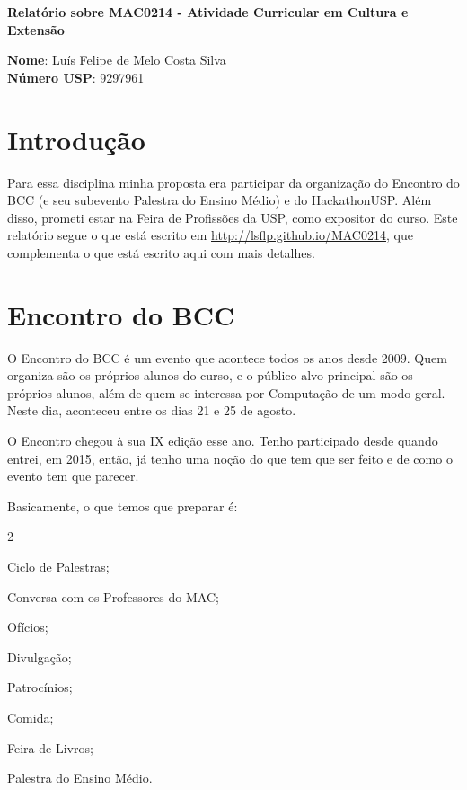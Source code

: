\documentclass[12pt,letterpaper]{article}
\begin{document}
	\begin{center}
		\Large \bf
		Relatório sobre MAC0214 - Atividade Curricular em Cultura e Extensão
	\end{center}
	
	\textbf{Nome}: Luís Felipe de Melo Costa Silva \\
	\textbf{Número USP}: 9297961
	
	\section*{Introdução}
	Para essa disciplina minha proposta era participar da organização do Encontro do BCC (e seu subevento Palestra do Ensino Médio) e do HackathonUSP. Além disso, prometi estar na Feira de Profissões da USP, como expositor do curso. Este relatório segue o que está escrito em \url{http://lsflp.github.io/MAC0214}, que complementa o que está escrito aqui com mais detalhes.
	
	\section{Encontro do BCC}
	O Encontro do BCC é um evento que acontece todos os anos desde 2009. Quem organiza são os próprios alunos do curso, e o público-alvo principal são os próprios alunos, além de quem se interessa por Computação de um modo geral. Neste dia, aconteceu entre os dias 21 e 25 de agosto.
	
	O Encontro chegou à sua IX edição esse ano. Tenho participado desde quando entrei, em 2015, então, já tenho uma noção do que tem que ser feito e de como o evento tem que parecer. 
	
	Basicamente, o que temos que preparar é:
	
	\begin{itemize}
	\end{itemize}
\end{document}
